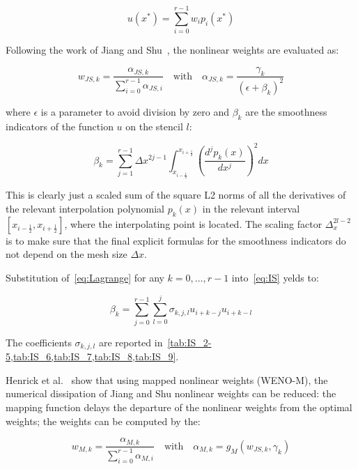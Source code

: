 \begin{equation}
  \label{eq:WENO_interp}
  u(x^*) = \sum_{i=0}^{r-1} w_i p_i(x^*)
\end{equation}

Following the work of Jiang and Shu~\cite{jiang-1996}, the nonlinear weights are evaluated as:

\begin{equation}
  \label{eq:nonlinear_weights}
  w_{JS,k} = \frac{\alpha_{JS,k}}{\sum_{i=0}^{r-1} \alpha_{JS,i}} \quad \text{with} \quad \alpha_{JS,k} = \frac{\gamma_k}{\left( \epsilon + \beta_k \right)^2}
\end{equation}

where $\epsilon$ is a parameter to avoid division by zero and $\beta_k$ are the smoothness indicators of the function $u$ on the stencil $l$:

\begin{equation}
  \label{eq:IS}
  \beta_k = \sum_{j=1}^{r-1} \Delta x^{2j-1} \int_{x_{i-\frac{1}{2}}}^{x_{i+\frac{1}{2}}} \left( \frac{d^j p_k(x)}{dx^j} \right)^2 dx
\end{equation}

This is clearly just a scaled sum of the square L2 norms of all the derivatives of the relevant interpolation polynomial $p_k(x)$ in the relevant interval $[x_{i−\frac{1}{2}},x_{i+\frac{1}{2}}]$, where the interpolating point is located. The scaling factor $\Delta_x^{2l-2}$ is to make sure that the final explicit formulas for the smoothness indicators do not depend on the mesh size $\Delta x$.

Substitution of~\eqref{eq:Lagrange} for any $k=0,\dots,r-1$ into~\eqref{eq:IS} yelds to:

\begin{equation}
  \label{eq:IS_u}
  \beta_k = \sum_{j=0}^{r-1} \sum_{l=0}^j \sigma_{k,j,l} u_{i+k-j} u_{i+k-l}
\end{equation}

The coefficients $\sigma_{k,j,l}$ are reported in~\cref{tab:IS_2-5,tab:IS_6,tab:IS_7,tab:IS_8,tab:IS_9}.

Henrick et al.~\cite{henrick-2005} show that using mapped nonlinear weights (WENO-M), the numerical dissipation of Jiang and Shu nonlinear weights can be reduced: the mapping function delays the departure of the nonlinear weights from the optimal weights; the weights can be computed by the:

\begin{equation}
  \label{eq:weno_M}
  w_{M,k} = \frac{\alpha_{M,k}}{\sum_{i=0}^{r-1} \alpha_{M,i}} \quad \text{with} \quad \alpha_{M,k} = g_M \left( w_{JS,k}, \gamma_k \right)
\end{equation}

